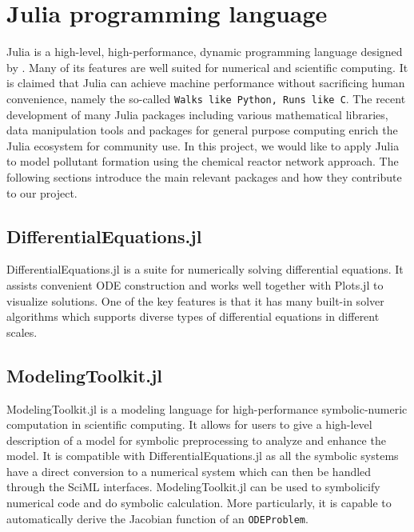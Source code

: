 \chapter{Julia programming language} \label{ch:julia}

Julia is a high-level, high-performance, dynamic programming language designed by \textcite{julia}. Many of its features are well suited for numerical and scientific computing. It is claimed that Julia can achieve machine performance without sacrificing human convenience, namely the so-called \texttt{Walks like Python, Runs like C}. The recent development of many Julia packages including various mathematical libraries, data manipulation tools and packages for general purpose computing enrich the Julia ecosystem for community use. In this project, we would like to apply Julia to model pollutant formation using the chemical reactor network approach. The following sections introduce the main relevant packages and how they contribute to our project.

\section{DifferentialEquations.jl}

DifferentialEquations.jl \parencite{DifferentialEquations.jl} is a suite for numerically solving differential equations. It assists convenient ODE construction and works well together with Plots.jl to visualize solutions. One of the key features is that it has many built-in solver algorithms which supports diverse types of differential equations in different scales.

\section{ModelingToolkit.jl}

ModelingToolkit.jl \parencite{ModelingToolkit.jl} is a modeling language for high-performance symbolic-numeric computation in scientific computing. It allows for users to give a high-level description of a model for symbolic preprocessing to analyze and enhance the model. It is compatible with DifferentialEquations.jl as all the symbolic systems have a direct conversion to a numerical system which can then be handled through the SciML interfaces. ModelingToolkit.jl can be used to symbolicify numerical code and do symbolic calculation. More particularly, it is capable to automatically derive the Jacobian function of an \texttt{ODEProblem}.

